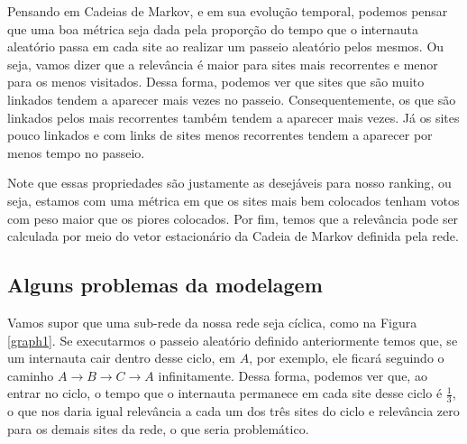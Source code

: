 \documentclass{article}
\begin{document}
Pensando em Cadeias de Markov, e em sua evolução temporal, podemos pensar que uma boa métrica seja dada pela proporção do tempo que o internauta aleatório passa em cada site ao realizar um passeio aleatório pelos mesmos. Ou seja, vamos dizer que a relevância é maior para sites mais recorrentes e menor para os menos visitados. Dessa forma, podemos ver que sites que são muito linkados tendem a aparecer mais vezes no passeio. Consequentemente, os que são linkados pelos mais recorrentes também tendem a aparecer mais vezes. Já os sites pouco linkados e com links de sites menos recorrentes tendem a aparecer por menos tempo no passeio.

Note que essas propriedades são justamente as desejáveis para nosso ranking, ou seja, estamos com uma métrica em que os sites mais bem colocados tenham votos com peso maior que os piores colocados. Por fim, temos que a relevância pode ser calculada por meio do vetor estacionário da Cadeia de Markov definida pela rede.

\subsection*{Alguns problemas da modelagem}


Vamos supor que uma sub-rede da nossa rede seja cíclica, como na Figura \ref{graph1}. Se executarmos o passeio aleatório definido anteriormente temos que, se um internauta cair dentro desse ciclo, em $A$, por exemplo, ele ficará seguindo o caminho $A\to B\to C\to A$ infinitamente. Dessa forma, podemos ver que, ao entrar no ciclo, o tempo que o internauta permanece em cada site desse ciclo é $\frac{1}{3}$, o que nos daria igual relevância a cada um dos três sites do ciclo e relevância zero para os demais sites da rede, o que seria problemático.
\end{document}
